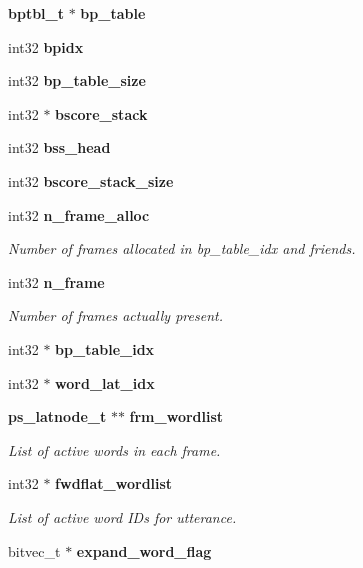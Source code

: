 \begin{DoxyCompactItemize}
\textbf{ bptbl\+\_\+t} $\ast$ {\bfseries bp\+\_\+table}
\item 
\mbox{\label{structngram__search__s_ad72007665bf21bb12261eb63c996a987}} 
int32 {\bfseries bpidx}
\item 
\mbox{\label{structngram__search__s_ae288500a2a3db50d4454546d66c826da}} 
int32 {\bfseries bp\+\_\+table\+\_\+size}
\item 
\mbox{\label{structngram__search__s_adbbac268728dae5771cb4400649b62e2}} 
int32 $\ast$ {\bfseries bscore\+\_\+stack}
\item 
\mbox{\label{structngram__search__s_aed45eb7f0ed7bbf266a7eb8e4acd22fa}} 
int32 {\bfseries bss\+\_\+head}
\item 
\mbox{\label{structngram__search__s_a041e34cc7c9dab32d05b00eeb5d6d622}} 
int32 {\bfseries bscore\+\_\+stack\+\_\+size}
\item 
int32 \textbf{ n\+\_\+frame\+\_\+alloc}
\begin{DoxyCompactList}\small\item\em Number of frames allocated in bp\+\_\+table\+\_\+idx and friends. \end{DoxyCompactList}\item 
int32 \textbf{ n\+\_\+frame}
\begin{DoxyCompactList}\small\item\em Number of frames actually present. \end{DoxyCompactList}\item 
\mbox{\label{structngram__search__s_ad6c1eda51d21c066ead7d68541546485}} 
int32 $\ast$ {\bfseries bp\+\_\+table\+\_\+idx}
\item 
\mbox{\label{structngram__search__s_a175cf4fa7cffa91b1966343f5a6f6eaf}} 
int32 $\ast$ {\bfseries word\+\_\+lat\+\_\+idx}
\item 
\textbf{ ps\+\_\+latnode\+\_\+t} $\ast$$\ast$ \textbf{ frm\+\_\+wordlist}
\begin{DoxyCompactList}\small\item\em List of active words in each frame. \end{DoxyCompactList}\item 
int32 $\ast$ \textbf{ fwdflat\+\_\+wordlist}
\begin{DoxyCompactList}\small\item\em List of active word I\+Ds for utterance. \end{DoxyCompactList}\item 
\mbox{\label{structngram__search__s_a1daa869d11179c53eb745da36a654fb3}} 
bitvec\+\_\+t $\ast$ {\bfseries expand\+\_\+word\+\_\+flag}
$$
\end{DoxyCompactItemize}
